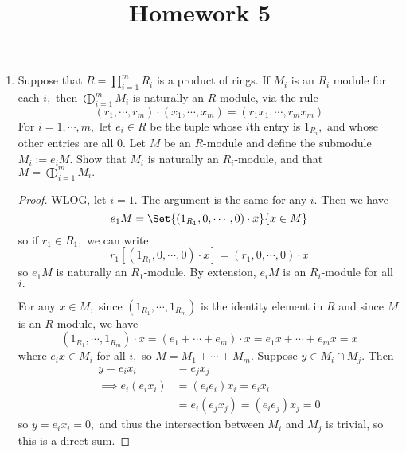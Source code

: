 \documentclass{article}
\begin{document}
\title{Homework 5}
\maketitle
\thispagestyle{fancy}

\begin{enumerate}
	\item Suppose that $R=\prod_{i=1}^{m}R_i$ is a product of rings. If $M_i$ is an $R_i$ module for each $i,$ then $\bigoplus_{i=1}^m M_i$ is naturally an $R$-module, via the rule
		\[(r_1, \cdots, r_m)\cdot(x_1, \cdots, x_m)=(r_1x_1, \cdots, r_m x_m)\]
		For $i=1, \cdots, m,$ let $e_i\in R$ be the tuple whose $i$th entry is $1_{R_i},$ and whose other entries are all 0. Let $M$ be an $R$-module and define the submodule $M_i:=e_iM.$ Show that $M_i$ is naturally an $R_i$-module, and that $M=\bigoplus_{i=1}^m M_i.$
		\begin{proof}
			WLOG, let $i=1.$ The argument is the same for any $i.$ Then we have
			\[e_1M=\Set{(1_{R_1}, 0, \cdots, 0)\cdot x}{x\in M}\]
			so if $r_1\in R_1,$ we can write
			\[r_1\left[(1_{R_1}, 0, \cdots, 0)\cdot x\right] = (r_1, 0, \cdots, 0)\cdot x\]
			so $e_1 M$ is naturally an $R_1$-module. By extension, $e_iM$ is an $R_i$-module for all $i.$

			For any $x\in M,$ since $(1_{R_1}, \cdots, 1_{R_m})$ is the identity element in $R$ and since $M$ is an $R$-module, we have
			\[(1_{R_1}, \cdots, 1_{R_m})\cdot x = (e_1+\cdots+e_m)\cdot x = e_1x + \cdots + e_mx = x\]
			where $e_ix\in M_i$ for all $i,$ so $M=M_1+\cdots+ M_m.$ Suppose $y\in M_i\cap M_j.$ Then
			\begin{align*}
				y = e_ix_i&=e_jx_j \\
				\implies e_i(e_ix_i) &= (e_ie_i)x_i = e_ix_i \\
				&= e_i(e_jx_j) = (e_ie_j)x_j = 0
			\end{align*}
			so $y=e_ix_i=0,$ and thus the intersection between $M_i$ and $M_j$ is trivial, so this is a direct sum.
		\end{proof}


\end{enumerate}
\end{document}
